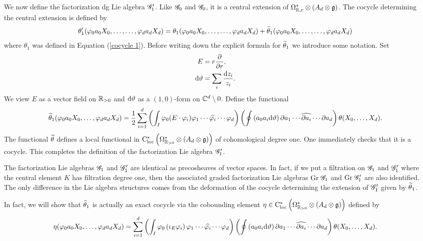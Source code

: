 \documentclass[10pt]{amsart}
\begin{document}
We now define the factorization dg Lie algebra $\sG_1'$. Like $\sG_0$ and $\sG_0$, it is a central extension of $\Omega^*_{\RR,c} \tensor (A_d \tensor \fg)$. The cocycle determining the central extension is defined by
\[
\theta_1' (\varphi_0 a_0 X_0, \ldots, \ldots, \varphi_d a_dX_d) = \theta_1(\varphi_0 a_0 X_0, \ldots, \ldots, \varphi_d a_dX_d) + \Tilde{\theta}_1(\varphi_0 a_0 X_0, \ldots, \ldots, \varphi_d a_dX_d) 
\]
where $\theta_1$ was defined in Equation (\ref{cocycle 1}). Before writing down the explicit formula for $\Tilde{\theta}_1$ we introduce some notation. Set
\begin{align*}
E & = r \frac{\partial}{\partial r} , \\
\d \vartheta & = \sum_i \frac{\d z_i}{z_i} .
\end{align*} 
We view $E$ as a vector field on $\RR_{>0}$ and $\d \vartheta$ as a $(1,0)$-form on $\CC^{d} \setminus 0$. Define the functional
\[
\Tilde{\theta}_1(\varphi_0 a_0 X_0,\ldots,\varphi_d a_d X_d) = \frac{1}{2} \sum_{i=1}^{d} \left( \int_I \varphi_0 (E \cdot \varphi_i) \varphi_1\cdots \Hat{\varphi_i} \cdots \varphi_{d}\right)\left(\oint \left(a_0 a_i \d \vartheta\right) \partial a_1 \cdots \Hat{\partial a_i} \cdots \partial a_d \right) \theta(X_0,\ldots,X_d)  .
\]
The functional $\Tilde{\theta}$ defines a local functional in $\cloc^*\left(\Omega^*_{\RR_{>0}} \tensor (A_d \tensor \fg) \right)$ of cohomological degree one. One immediately checks that it is a cocycle. This completes the definition of the factorization Lie algebra $\sG_1'$. 

The factorization Lie algebras $\sG_1$ and $\sG_1'$ are identical as precosheaves of vector spaces. In fact, if we put a filtration on $\sG_1$ and $\sG_1'$ where the central element $K$ has filtration degree one, then the associated graded factorization Lie algebras ${\rm Gr} \; \sG_1$ and ${\rm Gr} \; \sG_1'$ are also identified. The only difference in the Lie algebra structures comes from the deformation of the cocycle determining the extension of $\sG_1'$ given by $\Tilde{\theta}_1$. 

In fact, we will show that $\Tilde{\theta}_1$ is actually an exact cocycle via the cobounding element $\eta \in \cloc^*\left(\Omega^*_{\RR_{>0}} \tensor (A_d \tensor \fg)\right)$ defined by
\[
\eta(\varphi_0a_0X_0,\ldots,\varphi_da_dX_d) = \sum_{i=1}^d \left(\int_I \varphi_0 \left(\iota_{E} \varphi_i \right) \varphi_1 \cdots \Hat{\varphi_i} \cdots \varphi_d\right)\left(\oint \left(a_0 a_i \d \vartheta\right) \partial a_1 \cdots \Hat{\partial a_i} \cdots \partial a_d \right) \theta(X_0,\ldots,X_d)  .
\]
\end{document}
